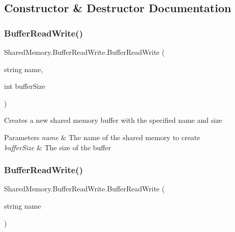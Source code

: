\subsection{Constructor \& Destructor Documentation}
\mbox{\label{class_shared_memory_1_1_buffer_read_write_ac672225accdac4dc8abd9d2e8a4aed30}} 
\subsubsection{\texorpdfstring{Buffer\+Read\+Write()}{BufferReadWrite()}\hspace{0.1cm}{\footnotesize\ttfamily [1/2]}}
{\footnotesize\ttfamily Shared\+Memory.\+Buffer\+Read\+Write.\+Buffer\+Read\+Write (\begin{DoxyParamCaption}\item[{string}]{name,  }\item[{int}]{buffer\+Size }\end{DoxyParamCaption})\hspace{0.3cm}{\ttfamily [inline]}}



Creates a new shared memory buffer with the specified name and size 


\begin{DoxyParams}{Parameters}
{\em name} & The name of the shared memory to create\\
\hline
{\em buffer\+Size} & The size of the buffer\\
\hline
\end{DoxyParams}
\mbox{\label{class_shared_memory_1_1_buffer_read_write_a64253e44bd62672502533b1644d85420}} 
\subsubsection{\texorpdfstring{Buffer\+Read\+Write()}{BufferReadWrite()}\hspace{0.1cm}{\footnotesize\ttfamily [2/2]}}
{\footnotesize\ttfamily Shared\+Memory.\+Buffer\+Read\+Write.\+Buffer\+Read\+Write (\begin{DoxyParamCaption}\item[{string}]{name }\end{DoxyParamCaption})\hspace{0.3cm}{\ttfamily [inline]}}



